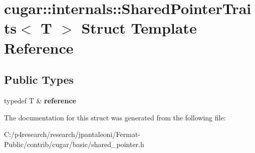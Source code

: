 \hypertarget{structcugar_1_1internals_1_1_shared_pointer_traits}{}\section{cugar\+:\+:internals\+:\+:Shared\+Pointer\+Traits$<$ T $>$ Struct Template Reference}
\label{structcugar_1_1internals_1_1_shared_pointer_traits}
\subsection*{Public Types}
\begin{DoxyCompactItemize}
\item 
\mbox{\label{structcugar_1_1internals_1_1_shared_pointer_traits_a1d4c56b8a08b021a9fc3ae60c8bc0094}} 
typedef T \& {\bfseries reference}
\end{DoxyCompactItemize}


The documentation for this struct was generated from the following file\+:\begin{DoxyCompactItemize}
\item 
C\+:/p4research/research/jpantaleoni/\+Fermat-\/\+Public/contrib/cugar/basic/shared\+\_\+pointer.\+h\end{DoxyCompactItemize}
